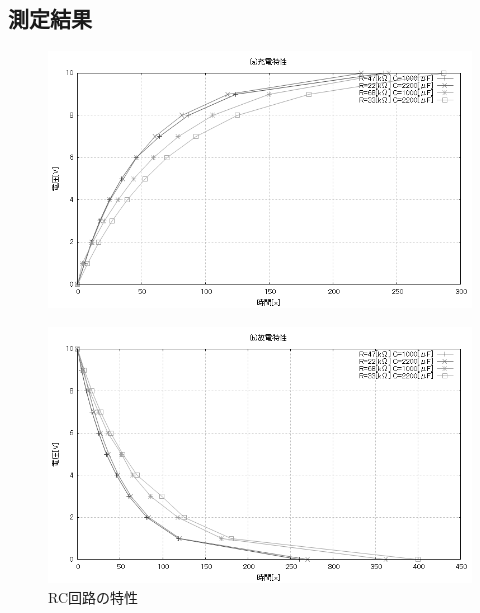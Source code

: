 \documentclass[titlepage]{jarticle}
\begin{document}
\subsection{測定結果}
\begin{figure}[H]
    \begin{center}
        \includegraphics[width=15cm]{graph/1.PNG}
    \end{center}
\end{figure}

\begin{figure}[H]
    \begin{center}
        \includegraphics[width=15cm]{graph/2.PNG}
        \caption{RC回路の特性}
    \end{center}
\end{figure}
\end{document}
